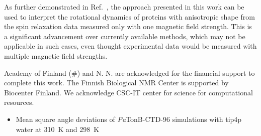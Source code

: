 \documentclass[journal=jpcbfk,manuscript=article]{achemso}
\begin{document}
As further demonstrated in Ref.~, the approach presented in this work can be used to interpret the
rotational dynamics of proteins with anisotropic shape from the
spin relaxation data measured only with one magnetic field strength.
This is a significant advancement over currently available methods,
which may not be applicable in such cases, even thought experimental
data would be measured with multiple magnetic field strengths.


\begin{acknowledgement}
  Academy of Finland (\#) and N. N. are acknowledged for the financial support
  to complete this work. The Finnish Biological NMR Center is supported by Biocenter Finland.
  We acknowledge CSC-IT center for science for computational resources.
\end{acknowledgement}

\begin{suppinfo}


\begin{itemize}
  \item Mean square angle deviations of {\it Pa}TonB-CTD-96 simulations with tip4p water at 310~K and 298~K 
\end{itemize}

\end{suppinfo}


\end{document}
